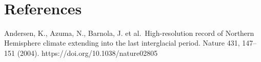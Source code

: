 \documentclass[11pt]{article}
\begin{document}
    \begin{center}
    \end{center}
    { \hspace*{\fill} \\}
    
    

    \hypertarget{references}{%
\section*{References}\label{references}}

Andersen, K., Azuma, N., Barnola, J. et al.~High-resolution record of
Northern Hemisphere climate extending into the last interglacial period.
Nature 431, 147--151 (2004). https://doi.org/10.1038/nature02805


    
    
    
\end{document}
